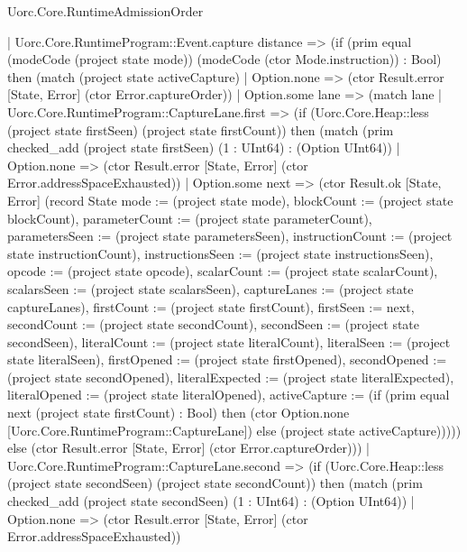 \begin{lexlean}{Uorc.Core.RuntimeAdmissionOrder}
\begin{semanticmodule}
{    | Uorc.Core.RuntimeProgram::Event.capture distance => (if (prim equal (modeCode (project state mode)) (modeCode (ctor Mode.instruction)) : Bool) then (match (project state activeCapture)
      | Option.none => (ctor Result.error [State, Error] (ctor Error.captureOrder))
      | Option.some lane => (match lane
        | Uorc.Core.RuntimeProgram::CaptureLane.first => (if (Uorc.Core.Heap::less (project state firstSeen) (project state firstCount)) then (match (prim checked_add (project state firstSeen) (1 : UInt64) : (Option UInt64))
          | Option.none => (ctor Result.error [State, Error] (ctor Error.addressSpaceExhausted))
          | Option.some next => (ctor Result.ok [State, Error] (record State {mode := (project state mode), blockCount := (project state blockCount), parameterCount := (project state parameterCount), parametersSeen := (project state parametersSeen), instructionCount := (project state instructionCount), instructionsSeen := (project state instructionsSeen), opcode := (project state opcode), scalarCount := (project state scalarCount), scalarsSeen := (project state scalarsSeen), captureLanes := (project state captureLanes), firstCount := (project state firstCount), firstSeen := next, secondCount := (project state secondCount), secondSeen := (project state secondSeen), literalCount := (project state literalCount), literalSeen := (project state literalSeen), firstOpened := (project state firstOpened), secondOpened := (project state secondOpened), literalExpected := (project state literalExpected), literalOpened := (project state literalOpened), activeCapture := (if (prim equal next (project state firstCount) : Bool) then (ctor Option.none [Uorc.Core.RuntimeProgram::CaptureLane]) else (project state activeCapture))}))) else (ctor Result.error [State, Error] (ctor Error.captureOrder)))
        | Uorc.Core.RuntimeProgram::CaptureLane.second => (if (Uorc.Core.Heap::less (project state secondSeen) (project state secondCount)) then (match (prim checked_add (project state secondSeen) (1 : UInt64) : (Option UInt64))
          | Option.none => (ctor Result.error [State, Error] (ctor Error.addressSpaceExhausted))
}
\end{semanticmodule}
\end{lexlean}
